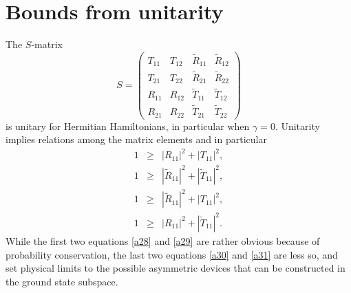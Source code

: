 \section{Bounds from unitarity}
%
The $S$-matrix
%
\begin{equation}
	S=\left(\begin{array}{cccc}
	T_{11}&T_{12}&\widetilde R_{11}&\widetilde R_{12}
	\\
	T_{21}&T_{22}&\widetilde R_{21}&\widetilde R_{22}
	\\
	R_{11}&R_{12}&\widetilde T_{11}&\widetilde T_{12}
	\\
	R_{21}&R_{22}&\widetilde T_{21}&\widetilde T_{22}
	\end{array}\right)
\end{equation}
%
is unitary for Hermitian Hamiltonians,  in particular when $\gamma=0$.
Unitarity implies relations among the matrix elements and in particular
%
\begin{eqnarray}
	1&\ge& |R_{11} |^2+|T_{11} |^2,\label{a28}
	\\
	1&\ge& |\widetilde R_{11}|^2+|\widetilde T_{11}|^2, \label{a29}
	\\
	1&\ge& |\widetilde R_{11} |^2+|T_{11} |^2,
	\label{a30}\\
	1&\ge& |R_{11} |^2+|\widetilde T_{11}|^2.\label{a31}
\end{eqnarray}
%
While the first two equations \eqref{a28} and \eqref{a29} are rather obvious because of  probability conservation, the last two equations
\eqref{a30} and \eqref{a31} are less so, and
set physical  limits to the possible asymmetric devices that can be constructed in the ground state subspace.
